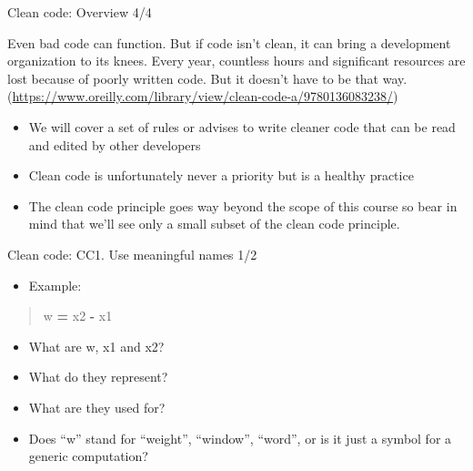 \documentclass[
  8pt,
  ignorenonframetext,
]{beamer}
\newenvironment{Shaded}{\begin{snugshade}}{\end{snugshade}}
\newcommand{\NormalTok}[1]{#1}
\newcommand{\OperatorTok}[1]{\textcolor[rgb]{0.81,0.36,0.00}{\textbf{#1}}}
\providecommand{\tightlist}{%
  \setlength{\itemsep}{0pt}\setlength{\parskip}{0pt}}
\begin{document}
\begin{frame}{Clean code: Overview 4/4}
\protect\hypertarget{clean-code-overview-44}{}
\begin{block}{Even bad code can function. But if code isn't clean, it
can bring a development organization to its knees. Every year, countless
hours and significant resources are lost because of poorly written code.
But it doesn't have to be that way.
(\url{https://www.oreilly.com/library/view/clean-code-a/9780136083238/})}
\protect\hypertarget{even-bad-code-can-function.-but-if-code-isnt-clean-it-can-bring-a-development-organization-to-its-knees.-every-year-countless-hours-and-significant-resources-are-lost-because-of-poorly-written-code.-but-it-doesnt-have-to-be-that-way.-httpswww.oreilly.comlibraryviewclean-code-a9780136083238}{}
\begin{itemize}
\item
  We will cover a set of rules or advises to write cleaner code that can
  be read and edited by other developers
\item
  Clean code is unfortunately never a priority but is a healthy practice
\item
  The clean code principle goes way beyond the scope of this course so
  bear in mind that we'll see only a small subset of the clean code
  principle.
\end{itemize}
\end{block}
\end{frame}

\begin{frame}[fragile]{Clean code: CC1. Use meaningful names 1/2}
\protect\hypertarget{clean-code-cc1.-use-meaningful-names-12}{}
\begin{itemize}[<+->]
\tightlist
\item
  Example:
\end{itemize}

\begin{quote}
\begin{Shaded}
\begin{Highlighting}[]
\NormalTok{w }\OperatorTok{=}\NormalTok{ x2 }\OperatorTok{{-}}\NormalTok{ x1}
\end{Highlighting}
\end{Shaded}
\end{quote}

\begin{itemize}[<+->]
\tightlist
\item
  What are w, x1 and x2?
\end{itemize}

\begin{itemize}[<+->]
\tightlist
\item
  What do they represent?
\item
  What are they used for?
\end{itemize}

\begin{itemize}[<+->]
\tightlist
\item
  Does ``w'' stand for ``weight'', ``window'', ``word'', or is it just a
  symbol for a generic computation?
\end{itemize}
\end{frame}
\end{document}

